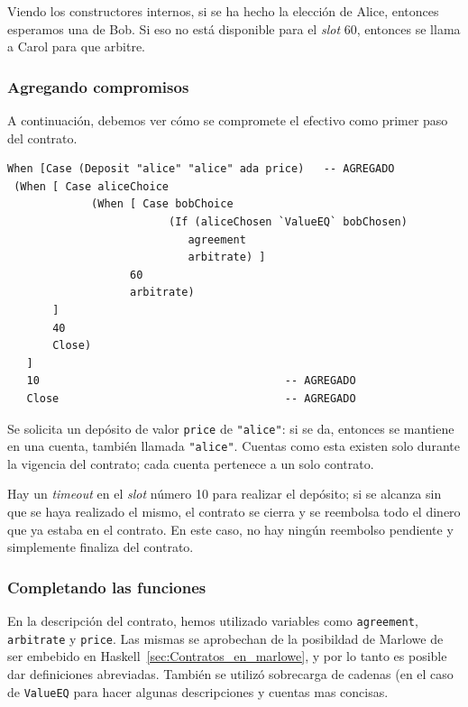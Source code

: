 \documentclass[12pt]{book}
\begin{document}
Viendo los constructores internos, si se ha hecho la elección de Alice, entonces esperamos una de Bob. Si eso no está disponible para el \textit{slot} 60, entonces se llama a Carol para que arbitre. 


\subsubsection{Agregando compromisos}

A continuación, debemos ver cómo se compromete el efectivo como primer paso del contrato.

\begin{minipage}{\linewidth}
\begin{lstlisting}[style=Haskell-cardano, language=Marlowe, caption=Pseudocódigo con validación de fondos.]
When [Case (Deposit "alice" "alice" ada price)   -- AGREGADO
 (When [ Case aliceChoice
             (When [ Case bobChoice
                         (If (aliceChosen `ValueEQ` bobChosen)
                            agreement
                            arbitrate) ]
                   60
                   arbitrate)
       ]
       40
       Close)
   ]
   10                                      -- AGREGADO
   Close                                   -- AGREGADO
\end{lstlisting}
\end{minipage}

Se solicita un depósito de valor \texttt{price} de \texttt{"{}alice"{}}: si se da, entonces se mantiene en una cuenta, también llamada \texttt{"{}alice"{}}. Cuentas como esta existen solo durante la vigencia del contrato; cada cuenta pertenece a un solo contrato.

Hay un \textit{timeout} en el \textit{slot} número 10 para realizar el depósito; si se alcanza sin que se haya realizado el mismo, el contrato se cierra y se reembolsa todo el dinero que ya estaba en el contrato. En este caso, no hay ningún reembolso pendiente y simplemente finaliza del contrato.

\subsubsection{Completando las funciones}
En la descripción del contrato, hemos utilizado variables como \texttt{agreement}, \texttt{arbitrate} y \texttt{price}. Las mismas se aprobechan de la posibildad de Marlowe de ser embebido en Haskell~\ref{sec:Contratos_en_marlowe}, y por lo tanto es posible dar definiciones abreviadas. También se utilizó sobrecarga de cadenas (en el caso de \texttt{ValueEQ} para hacer algunas descripciones y cuentas mas concisas.
\end{document}
